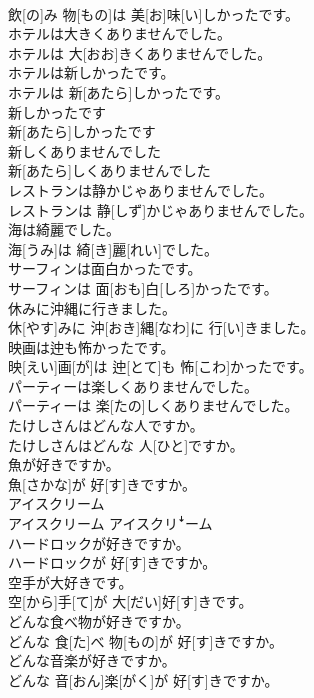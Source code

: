 \documentclass[8pt]{extreport}
\begin{document}
\begin{CJK}{UTF8}{min}
\\	飲[の]み 物[もの]は 美[お]味[い]しかったです。
\\	ホテルは大きくありませんでした。	
\\	ホテルは 大[おお]きくありませんでした。
\\	ホテルは新しかったです。	
\\	ホテルは 新[あたら]しかったです。
\\	新しかったです	
\\	新[あたら]しかったです
\\	新しくありませんでした	
\\	新[あたら]しくありませんでした
\\	レストランは静かじゃありませんでした。	
\\	レストランは 静[しず]かじゃありませんでした。
\\	海は綺麗でした。	
\\	海[うみ]は 綺[き]麗[れい]でした。
\\	サーフィンは面白かったです。	
\\	サーフィンは 面[おも]白[しろ]かったです。
\\	休みに沖縄に行きました。	
\\	休[やす]みに 沖[おき]縄[なわ]に 行[い]きました。
\\	映画は迚も怖かったです。	
\\	映[えい]画[が]は 迚[とて]も 怖[こわ]かったです。
\\	パーティーは楽しくありませんでした。	
\\	パーティーは 楽[たの]しくありませんでした。
\\	たけしさんはどんな人ですか。	
\\	たけしさんはどんな 人[ひと]ですか。
\\	魚が好きですか。	
\\	魚[さかな]が 好[す]きですか。
\\	アイスクリーム	
\\	アイスクリーム	アイスクリꜜーム
\\	ハードロックが好きですか。	
\\	ハードロックが 好[す]きですか。
\\	空手が大好きです。	
\\	空[から]手[て]が 大[だい]好[す]きです。
\\	どんな食べ物が好きですか。	
\\	どんな 食[た]べ 物[もの]が 好[す]きですか。
\\	どんな音楽が好きですか。	
\\	どんな 音[おん]楽[がく]が 好[す]きですか。

\end{CJK}
\end{document}
